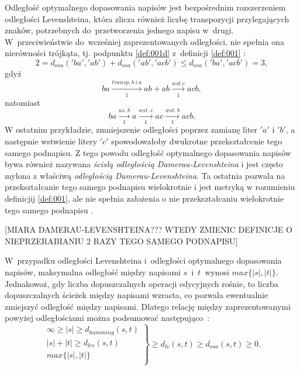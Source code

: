 \documentclass[12pt, twoside, openany]{report}
\theoremstyle{plain}
\begin{document}
Odległość optymalnego dopasowania napisów jest bezpośrednim rozszerzeniem odległości Levenshteina, która zlicza również liczbę transpozycji przylegających znaków, potrzebnych do~przetworzenia jednego napisu w~drugi. W~przeciwieństwie do~wcześniej zaprezentowanych odległości, nie spełnia ona nierówności trójkąta, tj. podpunktu \ref{def:001d} z~definicji \ref{def:001} \cite{Loo2014:stringdist}: 
$$2 = d_{osa}('ba', 'ab') + d_{osa}('ab', 'acb') \leq d_{osa}('ba', 'acb') = 3,$$ 
gdyż
$$
ba  \xrightarrow[1]{transp.\ b\ i \ a} ab + ab \xrightarrow[1]{wst. c} acb,
$$
natomiast
$$
ba  \xrightarrow[1]{us.\ b} a \xrightarrow[1]{wst.\ c} ac \xrightarrow[1]{wst.\ b} acb.
$$
W ostatnim przykładzie, zmniejszenie odległości poprzez zamianę liter $'a'$ i $'b'$, a następnie wstwienie litery $'c'$ spowodowałoby dwukrotne przekształcenie tego samego podnapisu. Z tego powodu odległość optymalnego dopasowania napisów bywa również nazywana \emph{ścisłą odległością Damerau-Levenshteina} i jest często mylona z właściwą \emph{odległością Damerau-Levenshteina}. Ta ostatnia pozwala na przekształcanie tego samego podnapisu wielokrotnie i jest metryką w rozumieniu definicjij \ref{def:001}, ale nie spełnia założenia o nie przekształcaniu wielokrotnie tego samego podnapisu \cite{Loo2014:stringdist}.

[MIARA DAMERAU-LEVENSHTEINA??? WTEDY ZMIENIC DEFINICJE O NIEPRZERABIANIU 2 RAZY TEGO SAMEGO PODNAPISU]

W~przypadku odległości Levenshteina i~odległości optymalnego dopasowania napisów, maksymalna odległość między napisami $s$~i~$t$~wynosi $max\{|s|, |t|\}$. Jednakowoż, gdy liczba dopuszczalnych operacji edycyjnych rośnie, to liczba dopuszczalnych ścieżek między napisami wzrasta, co pozwala ewentualnie zmiejszyć odległość między napisami. Dlatego relację między zaprezentowanymi powyżej odległościami można podsumować następująco~\cite{Loo2014:stringdist}:
$$
\left. \begin{array}{r}
\infty \geq |s| \geq d_{hamming}(s,t) \\
|s| + |t| \geq d_{lcs}(s,t) \\
max\{|s|, |t|\} \\
\end{array} \right \}
\geq d_{lv}(s,t) \geq d_{osa}(s,t) \geq 0.
$$

\end{document}
